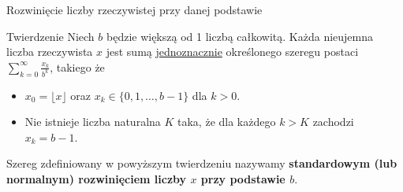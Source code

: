 \documentclass[a4paper,10pt]{beamer}
\begin{document}
	
			
			
	
	



\begin{frame}{Rozwinięcie liczby rzeczywistej przy danej podstawie}
	
	\begin{block}{Twierdzenie}
		Niech $b$ będzie większą od 1 liczbą całkowitą. Każda nieujemna liczba rzeczywista $x$ jest sumą \underline{jednoznacznie} określonego szeregu postaci $\displaystyle\sum\limits_{k=0}^\infty\frac{x_k}{b^k}$, takiego że
		\begin{itemize}
			\item $x_0=\lfloor x\rfloor$ oraz $x_k\in\{0,1,\ldots,b-1\}$ dla $k>0$.
			\item Nie istnieje liczba naturalna $K$ taka, że dla każdego $k>K$ zachodzi $x_k=b-1$.
		\end{itemize}
	\end{block}
	
	\bigskip

	Szereg zdefiniowany w powyższym twierdzeniu nazywamy {\bf standardowym (lub normalnym) rozwinięciem liczby $x$ przy podstawie $b$}.
	
\end{frame}
\end{document}
